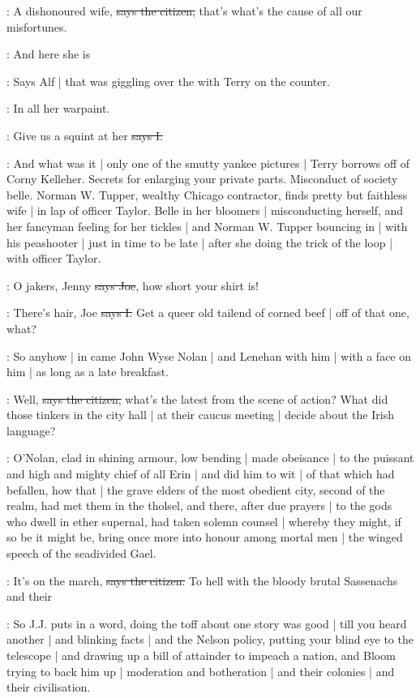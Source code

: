 \citizen:
A dishonoured wife,
\sout{says the citizen,}
that's what's the cause of all our misfortunes.

\bergan:
And here she is

\Nq:
Says Alf |
that was giggling over the 
with Terry on the counter.

\bergan:
In all her warpaint.

:
Give us a squint at her
\sout{says I.}

\Nq:
And what was it |
only one of the smutty yankee pictures |
Terry borrows off of Corny Kelleher.
Secrets for enlarging your private parts.
Misconduct of society belle.
Norman W. Tupper,
wealthy Chicago contractor,
finds pretty but faithless wife |
in lap of officer Taylor.
Belle in her bloomers |
misconducting herself,
and her fancyman feeling for her tickles |
and Norman W. Tupper bouncing in |
with his peashooter |
just in time to be late |
after she doing the trick of the loop |
with officer Taylor.

\joe:
O jakers,
Jenny
\sout{says Joe},
how short your shirt is!

:
There's hair,
Joe
\sout{says I.}
Get a queer old tailend of corned beef |
off of that one,
what?

\Nq:
So anyhow |
in came John Wyse Nolan |
and Lenehan with him |
with a face on him |
as long as a late breakfast.

\citizen:
Well,
\sout{says the citizen,}
what's the latest from the scene of action?
What did those tinkers in the city hall |
at their caucus meeting |
decide about the Irish language?

:
O'Nolan,
clad in shining armour,
low bending |
made obeisance |
to the puissant and high and mighty chief of all Erin |
and did him to wit |
of that which had befallen,
how that |
the grave elders of the most obedient city,
second of the realm,
had met them in the tholsel,
and there,
after due prayers |
to the gods who dwell in ether supernal,
had taken solemn counsel |
whereby they might,
if so be it might be,
bring once more into honour among mortal men |
the winged speech of the seadivided Gael.

\citizen:
It's on the march,
\sout{says the citizen.}
To hell with the bloody brutal Sassenachs and their 

\Nq:
So J.J. puts in a word,
doing the toff about one story was good |
till you heard another |
and blinking facts |
and the Nelson policy,
putting your blind eye to the telescope |
and drawing up a bill of attainder to impeach a nation,
and Bloom trying to back him up |
moderation and botheration |
and their colonies |
and their civilisation.

